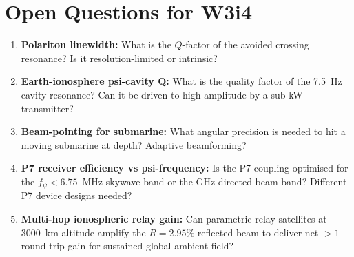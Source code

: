 \documentclass[aps,prd,twocolumn,superscriptaddress]{revtex4-2}
\begin{document}
\section{Open Questions for W3i4}
\label{sec:openq}

\begin{enumerate}
  \item \textbf{Polariton linewidth:} What is the $Q$-factor of the
    avoided crossing resonance?  Is it resolution-limited or intrinsic?
  \item \textbf{Earth-ionosphere psi-cavity Q:} What is the quality factor
    of the 7.5~Hz cavity resonance?  Can it be driven to high amplitude
    by a sub-kW transmitter?
  \item \textbf{Beam-pointing for submarine:} What angular precision is
    needed to hit a moving submarine at depth?  Adaptive beamforming?
  \item \textbf{P7 receiver efficiency vs psi-frequency:} Is the P7
    coupling optimised for the $f_\psi < 6.75$~MHz skywave band
    or the GHz directed-beam band?  Different P7 device designs needed?
  \item \textbf{Multi-hop ionospheric relay gain:} Can parametric relay
    satellites at 3000~km altitude amplify the $R = 2.95\%$ reflected
    beam to deliver net $> 1$ round-trip gain for sustained global
    ambient field?
\end{enumerate}
\end{document}
